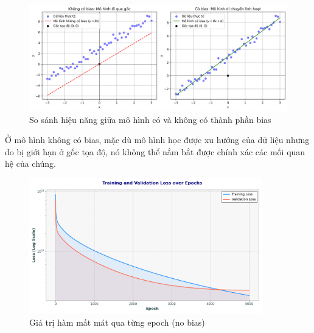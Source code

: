 \begin{figure}[H]
    \centering
    \includegraphics[width=1\linewidth]{img_multiple/bias_comparison_separate.png}
    \caption{So sánh hiệu năng giữa mô hình có và không có thành phần bias}
    \label{fig:bias_comparison}
\end{figure}

Ở mô hình không có bias, mặc dù mô hình học được xu hướng của dữ liệu nhưng do bị giới hạn ở gốc tọa độ, nó không thể nắm bắt được chính xác các mối quan hệ của chúng.

\begin{figure}[H]
    \centering
    \includegraphics[width=0.9\textwidth]{img_multiple/loss_no_bias.png} %
    \caption{Giá trị hàm mất mát qua từng epoch (no bias)}
    \label{fig:loss_no_bias}
\end{figure}

